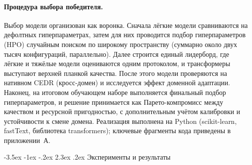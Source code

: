 \documentclass[12pt,a4paper]{report}
\makeatletter
\renewcommand{\section}{\@startsection{section}{1}{\z@}%
  {-3.5ex \@plus -1ex \@minus -.2ex}%
  {2.3ex \@plus .2ex}%
  {\normalfont\large\bfseries\centering}}
\makeatother
\begin{document}
\paragraph{Процедура выбора победителя.} Выбор модели организован как воронка. Сначала лёгкие модели сравниваются на дефолтных гиперпараметрах, затем для них проводится подбор гиперпараметров (HPO) случайным поиском по широкому пространству (суммарно около двух тысяч конфигураций, параллельно). Далее строится единый лидерборд, где лёгкие и тяжёлые модели оцениваются одним протоколом, и трансформеры выступают верхней планкой качества. После этого модели проверяются на нативном CEDR (кросс-домен) и исследуется эффект доменной адаптации. Наконец, на итоговом обучающем наборе выполняется финальный подбор гиперпараметров, и решение принимается как Парето-компромисс между качеством и ресурсной пригодностью, с дополнительным учётом калибровки и устойчивости к смене домена. Реализация выполнена на Python (scikit-learn, fastText, библиотека transformers); ключевые фрагменты кода приведены в приложении~А.

\section{Эксперименты и результаты}
\end{document}
